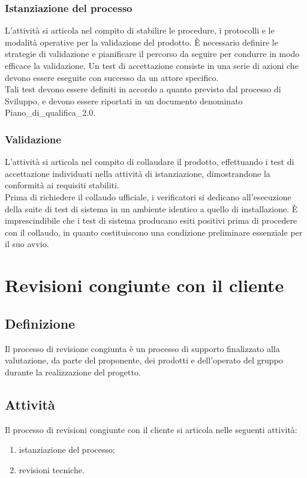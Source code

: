 \subsubsection{Istanziazione del processo}
 L'attività si articola nel compito di stabilire le procedure, i protocolli e le modalità operative per la validazione del prodotto. È necessario definire le strategie di validazione e pianificare il percorso da seguire per condurre in modo efficace la validazione. Un test di accettazione consiste in una serie di azioni che devono essere eseguite con successo da un attore specifico.\\
 Tali test devono essere definiti in accordo a quanto previsto dal processo di Sviluppo, e devono essere riportati in un documento denominato Piano\_di\_qualifica\_2.0.
\subsubsection{Validazione}
L'attività si articola nel compito di collaudare il prodotto, effettuando i test di accettazione individuati nella attività di istanziazione, dimostrandone la conformità ai requisiti stabiliti.\\
Prima di richiedere il collaudo ufficiale, i verificatori si dedicano all'esecuzione della suite di test di sistema in un ambiente identico a quello di installazione. È imprescindibile che i test di sistema producano esiti positivi prima di procedere con il collaudo, in quanto costituiscono una condizione preliminare essenziale per il suo avvio.


\newpage

\section{Revisioni congiunte con il cliente} \label{sec:revisionicliente}
\subsection{Definizione}
Il processo di revisione congiunta è un processo di supporto finalizzato alla valutazione, da parte del proponente, dei prodotti e dell'operato del gruppo durante la realizzazione del progetto.
\subsection{Attività}
Il processo di revisioni congiunte con il cliente si articola nelle seguenti attività:
\begin{enumerate}
    \item istanziazione del processo;
    \item revisioni tecniche.
\end{enumerate}
